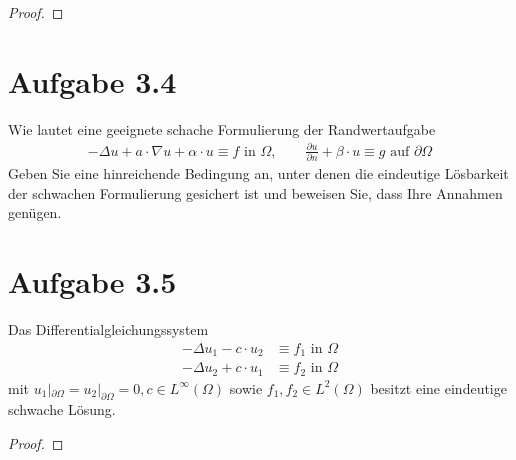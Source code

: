 \documentclass[12pt,a4paper]{article}
\begin{document}
\begin{proof}

\end{proof}

\section*{Aufgabe 3.4}
Wie lautet eine geeignete schache Formulierung der Randwertaufgabe
\begin{align*}
-\Delta u+a\cdot\nabla u+\alpha\cdot u\equiv f\text{ in }\Omega,\qquad\frac{\partial u}{\partial n}+\beta\cdot u\equiv g\text{ auf } \partial\Omega
\end{align*}
Geben Sie eine hinreichende Bedingung an, unter denen die eindeutige Lösbarkeit der schwachen Formulierung gesichert ist und beweisen Sie, dass Ihre Annahmen genügen.

\begin{lösung}

\end{lösung}

\section*{Aufgabe 3.5}
Das Differentialgleichungssystem
\begin{align*}
-\Delta u_1-c\cdot u_2&\equiv f_1\text{ in }\Omega\\
-\Delta u_2+c\cdot u_1&\equiv f_2\text{ in }\Omega
\end{align*}
mit $u_1|_{\partial\Omega}=u_2|_{\partial\Omega}=0,c\in L^\infty(\Omega)$ sowie $f_1,f_2\in L^2(\Omega)$ besitzt eine eindeutige schwache Lösung.

\begin{proof}

\end{proof}
\end{document}

